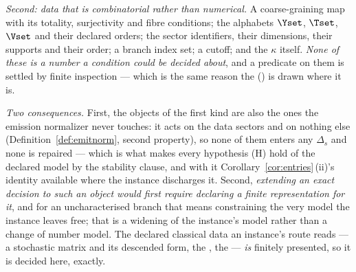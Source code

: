 \begin{remark}
\emph{Second: data that is combinatorial rather than numerical.} A
coarse-graining map with its totality, surjectivity and fibre conditions; the
alphabets $\Yset$, $\Tset$, $\Vset$ and their declared orders; the sector
identifiers, their dimensions, their supports and their order; a branch index
set; a cutoff; and the  $\kappa$ itself. \emph{None of these is a
number a condition could be decided about}, and a predicate on them is settled
by finite inspection --- which is the same reason the 
() is drawn where it is.

\emph{Two consequences.} First, the objects of the first kind are also the
ones the emission normalizer never touches: it acts on the data sectors and on
nothing else (Definition~\ref{def:emitnorm}, second property), so none of them
enters any $\Delta_s$ and none is repaired --- which is what makes every
hypothesis (H) hold of the declared model by the stability clause, and with it
Corollary~\ref{cor:entries}\,(ii)'s identity available where the instance
discharges it. Second, \emph{extending an exact decision to such an object
would first require declaring a finite representation for it}, and for an
uncharacterised branch that means constraining the very model the instance
leaves free; that is a widening of the instance's model rather than a change
of number model. The declared classical data an instance's route reads --- a
stochastic matrix and its descended form, the , the
 --- \emph{is} finitely presented, so it is decided here,
exactly.
\end{remark}

